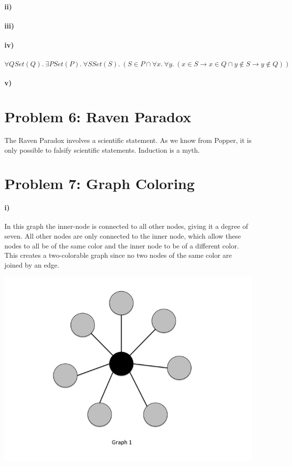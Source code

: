 \documentclass[10pt,letter]{article}
\begin{document}
\paragraph{ii)}

\paragraph{iii)}

\paragraph{iv)}
$\forall Q Set(Q) .\ \exists P Set(P) .\ \forall S Set(S) .\ (S \in P \cap \forall x .\ \forall y .\ (x \in S \rightarrow x \in Q \cap y \not \in S \rightarrow y \not \in Q))$
\paragraph{v)}

\section*{Problem 6: Raven Paradox}
The Raven Paradox involves a scientific statement. As we know from Popper, it is only possible to falsify scientific statements. Induction is a myth.

\section*{Problem 7: Graph Coloring}

\paragraph{i)}
In this graph the inner-node is connected to all other nodes, giving it a degree of seven. All other nodes are only connected to the inner node, which allow these nodes to all be of the same color and the inner node to be of a different color. This creates a two-colorable graph since no two nodes of the same color are joined by an edge. \\
\begin{minipage}{.8\textwidth}
\includegraphics[width=.8\linewidth]{hw3_slide1.jpg}
\end{minipage}
\end{document}
